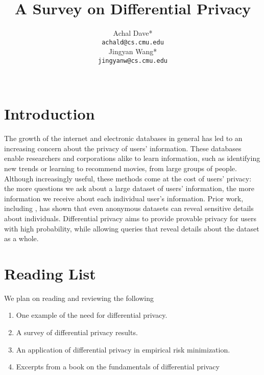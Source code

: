 \documentclass{article} %
\title{A Survey on Differential Privacy}
\author{
Achal Dave* \\
\texttt{achald@cs.cmu.edu} \\
\And
Jingyan Wang* \\
\texttt{jingyanw@cs.cmu.edu} \\
\\
}
\begin{document}
\maketitle

\section{Introduction}

The growth of the internet and electronic databases in general has led to an
increasing concern about the privacy of users' information. These databases
enable researchers and corporations alike to learn information, such as
identifying new trends or learning to recommend movies, from large
groups of people. Although increasingly useful, these methods come at the cost
of users' privacy: the more questions we ask about a large dataset of users'
information, the more information we receive about each individual user's
information. Prior work, including \cite{narayanan2008robust,
sweeney1997weaving, ganta2008composition}, has shown that even anonymous
datasets can reveal sensitive details about individuals. Differential privacy
aims to provide provable privacy for users with high probability, while allowing
queries that reveal details about the dataset as a whole.

\section{Reading List}

We plan on reading and reviewing the following
\begin{enumerate}
\item One example of the need for differential privacy. \cite{narayanan2008robust}
\item A survey of differential privacy results. \cite{dwork2008differential}
\item An application of differential privacy in empirical risk minimization.
\cite{chaudhuri2011differentially}
\item Excerpts from a book on the fundamentals of differential privacy
\cite{dwork2014algorithmic}
\end{enumerate}

{\small


}
\end{document}
